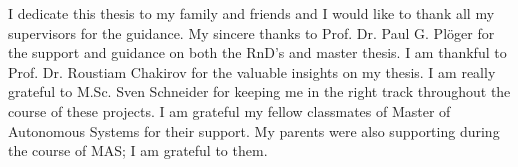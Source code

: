  
 
I dedicate this thesis to my family and friends and I would like to thank all my supervisors for the guidance. My sincere thanks to Prof. Dr. Paul G. Pl\"oger for the support and guidance on both the RnD's and master thesis. I am thankful to Prof. Dr. Roustiam Chakirov for the valuable insights on my thesis. I am really grateful to M.Sc. Sven Schneider for keeping me in the right track throughout the course of these projects. I am grateful my fellow classmates of Master of Autonomous Systems for their support. My parents were also supporting during the course of MAS; I am grateful to them. 